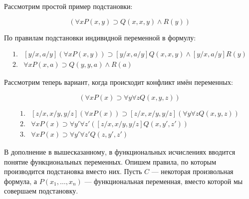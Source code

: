 \begin{example}
    Рассмотрим простой пример подстановки:

    \begin{equation*}
        [y/x,a/y](\forall x P(x,y) \supset Q(x, x, y) \land R(y))
    \end{equation*}

    По правилам подстановки индивидной переменной в формулу:

    \begin{equation*}
        \begin{array}{ll}
            1. & [y/x,a/y](\forall x P(x,y)) \supset [y/x,a/y]Q(x, x, y) \land [y/x,a/y]R(y)
            \\
            2. & \forall x P(x,a) \supset Q(y,y,a) \land R(a)
        \end{array}
    \end{equation*}

\end{example}

\begin{example}
    Рассмотрим теперь вариант, когда происходит конфликт имён переменных:

    \begin{equation*}
        [z/x, x/y, y/z](\forall x P(x) \supset \forall y \forall z Q(x,y,z))
    \end{equation*}

    \begin{equation*}
        \begin{array}{ll}
            1. & [z/x, x/y, y/z](\forall x P(x)) \supset [z/x, x/y, y/z](\forall y \forall z Q(x,y,z))
            \\
            2. & \forall x P(x) \supset \forall y' \forall z' ([z/x, x/y, y/z]Q(x,y',z'))
            \\
            3. & \forall x P(x) \supset \forall y' \forall z' Q(z, y', z')
        \end{array}
    \end{equation*}
\end{example}

В дополнение в вышесказанному, в функциональных исчислениях вводится понятие функциональных переменных. Опишем правила, по которым производится подстановка вместо них. Пусть $C$ --- некоторая произвольная формула, а $P(x_1,\dots,x_n)$ --- функциональная переменная, вместо которой мы совершаем подстановку.

